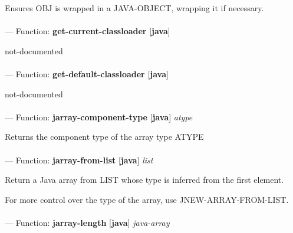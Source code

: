\begin{adjustwidth}{5em}{5em}
Ensures OBJ is wrapped in a JAVA-OBJECT, wrapping it if necessary.
\end{adjustwidth}

\paragraph{}
\label{JAVA:GET-CURRENT-CLASSLOADER}
--- Function: \textbf{get-current-classloader} [\textbf{java}] \textit{}

\begin{adjustwidth}{5em}{5em}
not-documented
\end{adjustwidth}

\paragraph{}
\label{JAVA:GET-DEFAULT-CLASSLOADER}
--- Function: \textbf{get-default-classloader} [\textbf{java}] \textit{}

\begin{adjustwidth}{5em}{5em}
not-documented
\end{adjustwidth}

\paragraph{}
\label{JAVA:JARRAY-COMPONENT-TYPE}
--- Function: \textbf{jarray-component-type} [\textbf{java}] \textit{atype}

\begin{adjustwidth}{5em}{5em}
Returns the component type of the array type ATYPE
\end{adjustwidth}

\paragraph{}
\label{JAVA:JARRAY-FROM-LIST}
--- Function: \textbf{jarray-from-list} [\textbf{java}] \textit{list}

\begin{adjustwidth}{5em}{5em}
Return a Java array from LIST whose type is inferred from the first element.

For more control over the type of the array, use JNEW-ARRAY-FROM-LIST.
\end{adjustwidth}

\paragraph{}
\label{JAVA:JARRAY-LENGTH}
--- Function: \textbf{jarray-length} [\textbf{java}] \textit{java-array}

